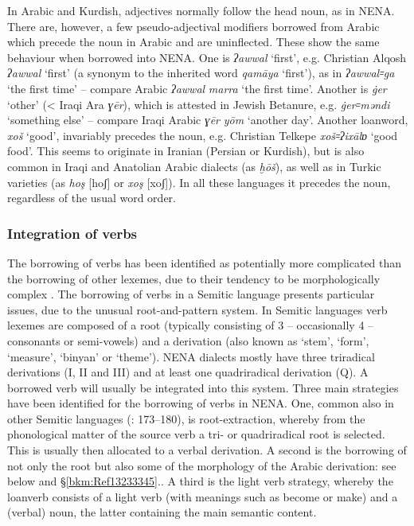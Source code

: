 \documentclass[output=paper]{langsci/langscibook}
\begin{document}
In Arabic and Kurdish, adjectives normally follow the head noun, as in NENA. There are, however, a few pseudo-adjectival modifiers borrowed from Arabic which precede the noun in Arabic and are uninflected. These show the same behaviour when borrowed into NENA. One is \textit{ʔawwal} ‘first’, e.g. Christian Alqosh \textit{ʔawwal} ‘first’ (a synonym to the inherited word \textit{qamāya} ‘first’), as in \textit{ʔawwal꞊ga} ‘the first time’ – compare Arabic \textit{ʔawwal} \textit{marra} ‘the first time’. Another is \textit{\.ger} ‘other’ (< Iraqi Ara \textit{ɣēr}), which is attested in Jewish Betanure, e.g. \textit{\.ger꞊məndi} ‘something else’ \citep[105]{Mutzafi2008} – compare Iraqi Arabic \textit{ɣēr} \textit{yōm} ‘another day’. Another loanword, \textit{xoš} ‘good’, invariably precedes the noun, e.g. Christian Telkepe \textit{xoš꞊ʔixālɒ} ‘good food’. This seems to originate in Iranian (Persian or Kurdish), but is also common in Iraqi and Anatolian Arabic dialects (as \textit{ḫōš}), as well as in Turkic varieties (as \textit{hoş} [hoʃ] or \textit{xoş} [xoʃ]). In all these languages it precedes the noun, regardless of the usual word order.

\subsubsection{\label{bkm:Ref13233110}Integration of verbs}

The borrowing of verbs has been identified as potentially more complicated than the borrowing of other lexemes, due to their tendency to be morphologically complex \citep[175]{Matras2009}. The borrowing of verbs in a Semitic language presents particular issues, due to the unusual root-and-pattern system. In Semitic languages verb lexemes are composed of a root (typically consisting of 3 – occasionally 4 – consonants or semi-vowels) and a derivation (also known as ‘stem’, ‘form’, ‘measure’, ‘binyan’ or ‘theme’). NENA dialects mostly have three triradical derivations (I, II and III) and at least one quadriradical derivation (Q). A borrowed verb will usually be integrated into this system. Three main strategies have been identified for the borrowing of verbs in NENA. One, common also in other Semitic languages (\citealt{Wohlgemuth2009}: 173–180), is root-extraction, whereby from the phonological matter of the source verb a tri- or quadriradical root is selected. This is usually then allocated to a verbal derivation. A second is the borrowing of not only the root but also some of the morphology of the Arabic derivation: see below and §\ref{bkm:Ref13233345}.. A third is the light verb strategy, whereby the loanverb consists of a light verb (with meanings such as become or make) and a (verbal) noun, the latter containing the main semantic content. 
\end{document}
